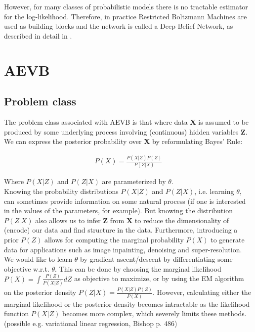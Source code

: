 \documentclass{article}
\begin{document}
However, for many classes of probabilistic models there is no tractable estimator for the log-likelihood. Therefore, in practice Restricted Boltzmann Machines are used as building blocks and the network is called a Deep Belief Network, as described in detail in \cite{hinton2006reducing}.



\section{AEVB}

\subsection*{Problem class}

The problem class associated with AEVB is that where data $\mathbf{X}$ is assumed to be produced by some underlying process involving (continuous) hidden variables $\mathbf{Z}$. We can express the posterior probability over $\mathbf{X}$ by reformulating Bayes' Rule:

\begin{align}
P(X) = \frac{P(X|Z)P(Z)}{P(Z|X)}
\end{align}

Where $P(X|Z)$ and $P(Z|X)$ are parameterized by $\theta$.
\\

Knowing the probability distributions $P(X|Z)$ and $P(Z|X)$, i.e. learning $\theta$, can sometimes provide information on some natural process (if one is interested in the values of the parameters, for example). But knowing the distribution $P(Z|X)$ also allows us to infer $\mathbf{Z}$ from $\mathbf{X}$ to reduce the dimensionality of (encode) our data and find structure in the data. Furthermore, introducing a prior $P(Z)$ allows for computing the marginal probability $P(X)$ to generate data for applications such as image inpainting, denoising and super-resolution.
We would like to learn $\theta$ by gradient ascent/descent by differentiating some objective w.r.t. $\theta$. This can be done by choosing the marginal likelihood $P(X) = \int \frac{P(Z)}{P(X|Z)}dZ$ as objective to maximize, or by using the EM algorithm on the posterior density $ P(Z|X) = \frac{P(X|Z)P(Z)}{P(X)}$. However, calculating either  the marginal likelihood or the posterior density becomes intractable as the likelihood function $P(X|Z)$	 becomes more complex, which severely limits these methods. (possible e.g. variational linear regression, Bishop p. 486)
\end{document}

